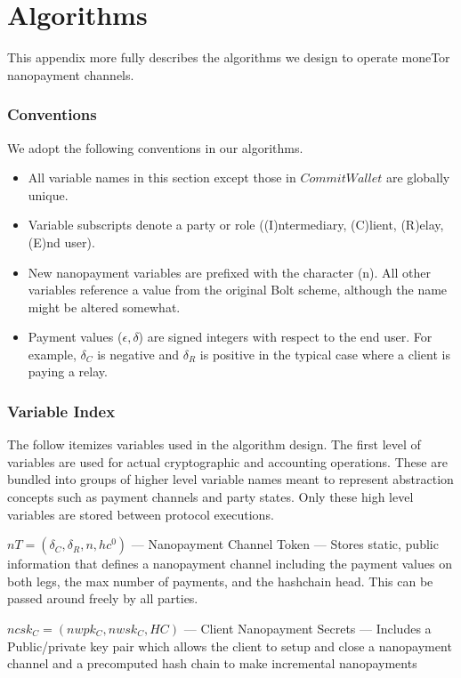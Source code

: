 \chapter{Algorithms}
\label{chap:algorithms}

This appendix more fully describes the algorithms we design to operate moneTor nanopayment
channels.

\subsection{Conventions}

We adopt the following conventions in our algorithms.

\begin{itemize}
\item All variable names in this section except those in $Commit Wallet$ are
  globally unique.
\item Variable subscripts denote a party or role ((I)ntermediary,
  (C)lient, (R)elay, (E)nd user).
\item New nanopayment variables are prefixed with the character
  (n). All other variables reference a value from the original Bolt
  scheme, although the name might be altered somewhat.
\item Payment values ($\epsilon, \delta$) are signed integers with
  respect to the end user. For example, $\delta_C$ is negative and
  $\delta_R$ is positive in the typical case where a client is paying
  a relay.
\end{itemize}

\subsection{Variable Index}

The follow itemizes variables used in the algorithm design. The first level of
variables are used for actual cryptographic and accounting operations. These are
bundled into groups of higher level variable names meant to represent
abstraction concepts such as payment channels and party states. Only these high
level variables are stored between protocol executions.

$nT = (\delta_C, \delta_R, n, hc^0)$ --- Nanopayment Channel Token ---
Stores static, public information that defines a nanopayment channel including
the payment values on both legs, the max number of payments, and the hashchain
head. This can be passed around freely by all parties.

$ncsk_C = (nwpk_C, nwsk_C, HC)$ --- Client Nanopayment Secrets --- Includes
a Public/private key pair which allows the client to setup and close a
nanopayment channel and a precomputed hash chain to make incremental
nanopayments

